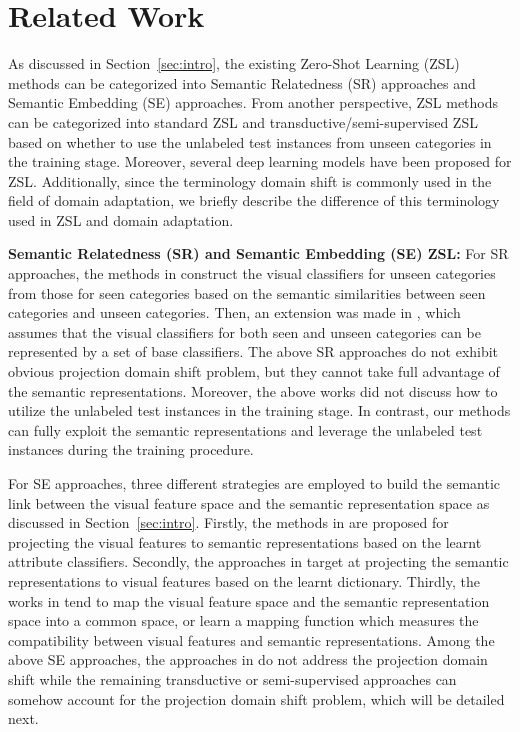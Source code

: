 \documentclass[journal]{IEEEtran}
\begin{document}
\section{Related Work} \label{sec:related}
As discussed in Section~\ref{sec:intro}, the existing Zero-Shot Learning (ZSL) methods can be categorized into Semantic Relatedness (SR) approaches and Semantic Embedding (SE) approaches. From another perspective, ZSL methods can be categorized into standard ZSL and transductive/semi-supervised ZSL based on whether to use the unlabeled test instances from unseen categories in the training stage. Moreover, several deep learning models have been proposed for ZSL. Additionally, since the terminology domain shift is commonly used in the field of domain adaptation, we briefly describe the difference of this terminology used in ZSL and domain adaptation.

\noindent\textbf{Semantic Relatedness (SR) and Semantic Embedding (SE) ZSL:} For SR approaches, the methods in \cite{mensink2014costa, zhang2015zero, norouzi2013zero} construct the visual classifiers for unseen categories from those for seen categories based on the semantic similarities between seen categories and unseen categories. Then, an extension was made in \cite{changpinyo2016synthesized}, which assumes that the visual classifiers for both seen and unseen categories can be represented by a set of base classifiers. The above SR approaches do not exhibit obvious projection domain shift problem, but they cannot take full advantage of the semantic representations. Moreover, the above works did not discuss how to utilize the unlabeled test instances in the training stage. In contrast, our methods can fully exploit the semantic representations and leverage the unlabeled test instances during the training procedure.

For SE approaches, three different strategies are employed to build the semantic link between the visual feature space and the semantic representation space as discussed in Section~\ref{sec:intro}. Firstly, the methods in \cite{lampert2014attribute, bucher2016improving, xu2017transductive, jayaraman2014decorrelating} are proposed for projecting the visual features to semantic representations based on the learnt attribute classifiers. Secondly, the approaches in \cite{kodirov2015unsupervised,shojaee2016semi} target at projecting the semantic representations to visual features based on the learnt dictionary. Thirdly, the works in \cite{frome2013devise, fu2014transductive, li2015semi, xian2016latent, zhang2016zerose, akata2015evaluation, li2015max, romera2015embarrassingly, guo2016transductive, long2016attribute, al2016recovering} tend to map the visual feature space and the semantic representation space into a common space, or learn a mapping function which measures the compatibility between visual features and semantic representations. Among the above SE approaches, the approaches in \cite{xian2016latent, zhang2016zerose, bucher2016improving, akata2015evaluation, lampert2014attribute, long2016attribute} do not address the projection domain shift while the remaining transductive or semi-supervised approaches can somehow account for the projection domain shift problem, which will be detailed next.
\end{document}
